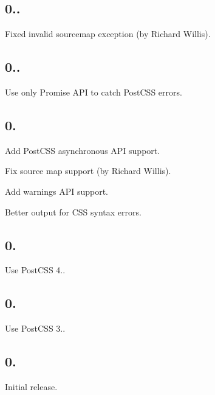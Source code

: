 \subsection*{0..}


\begin{DoxyItemize}
\item Fixed invalid sourcemap exception (by Richard Willis).
\end{DoxyItemize}

\subsection*{0..}


\begin{DoxyItemize}
\item Use only Promise A\+PI to catch Post\+C\+SS errors.
\end{DoxyItemize}

\subsection*{0.}


\begin{DoxyItemize}
\item Add Post\+C\+SS asynchronous A\+PI support.
\item Fix source map support (by Richard Willis).
\item Add warnings A\+PI support.
\item Better output for C\+SS syntax errors.
\end{DoxyItemize}

\subsection*{0.}


\begin{DoxyItemize}
\item Use Post\+C\+SS 4..
\end{DoxyItemize}

\subsection*{0.}


\begin{DoxyItemize}
\item Use Post\+C\+SS 3..
\end{DoxyItemize}

\subsection*{0.}


\begin{DoxyItemize}
\item Initial release. 
\end{DoxyItemize}
